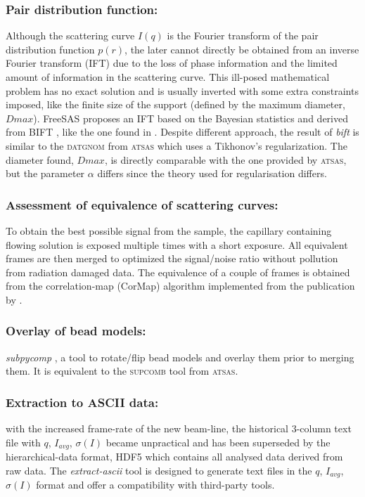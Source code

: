 \documentclass[preprint]{iucr}              %
\begin{document}
\subsubsection{Pair distribution function:}
Although the scattering curve $I(q)$ is the Fourier transform of the pair distribution function $p(r)$, the later cannot directly be obtained from an inverse Fourier transform (IFT) due to the loss of phase information and the limited amount of information in the scattering curve. 
This ill-posed mathematical problem has no exact solution and is usually inverted with some extra constraints imposed, like the finite size of the support (defined by the maximum diameter, $Dmax$).    
FreeSAS proposes an IFT based on the Bayesian statistics and derived from BIFT \cite{bift}, like the one found in .
Despite different approach, the result of \textit{bift} is similar to the \textsc{datgnom} \cite{ATSAS1} from \textsc{atsas} which uses a Tikhonov's regularization.
The diameter found, $Dmax$, is directly comparable with the one provided by \textsc{atsas}, but the parameter $\alpha$ differs since the theory used for regularisation differs. 

\subsubsection{Assessment of equivalence of scattering curves: }
To obtain the best possible signal from the sample, the capillary containing flowing solution is exposed multiple times with a short exposure.
All equivalent frames are then merged to optimized the signal/noise ratio without pollution from radiation damaged data.  
The equivalence of a couple of frames is obtained from the correlation-map (CorMap) algorithm implemented from the publication by .

\subsubsection{Overlay of bead models:}
\textit{subpycomp} \cite{BM29ODA}, a tool to rotate/flip bead models and overlay them prior to merging them. It is equivalent to the \textsc{supcomb} \cite{supcomb} tool from \textsc{atsas}. 

\subsubsection{Extraction to ASCII data:} with the increased frame-rate of the new beam-line, the historical 3-column text file with $q$, $I_{avg}$, $\sigma(I)$ became unpractical and has been superseded by the hierarchical-data format, HDF5 \cite{hdf5} which contains all analysed data derived from raw data.
The \textit{extract-ascii} tool is designed to generate text files in the  $q$, $I_{avg}$, $\sigma(I)$ format and offer a compatibility with third-party tools.
\end{document}
